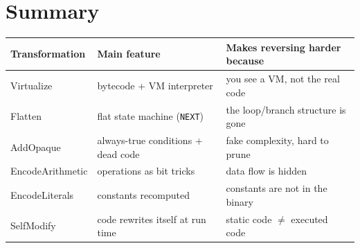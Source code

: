 \documentclass[11pt,a4paper]{article}
\newcommand{\code}[1]{\texttt{\small #1}}
\begin{document}
\section{Summary}
\begin{center}\small
\begin{tabular}{@{}lll@{}}
\toprule
\textbf{Transformation} & \textbf{Main feature} & \textbf{Makes reversing harder because} \\ \midrule
Virtualize       & bytecode + VM interpreter        & you see a VM, not the real code \\
Flatten          & flat state machine (\code{NEXT})  & the loop/branch structure is gone \\
AddOpaque        & always-true conditions + dead code & fake complexity, hard to prune \\
EncodeArithmetic & operations as bit tricks          & data flow is hidden \\
EncodeLiterals   & constants recomputed              & constants are not in the binary \\
SelfModify       & code rewrites itself at run time  & static code $\neq$ executed code \\ \bottomrule
\end{tabular}
\end{center}
\end{document}
